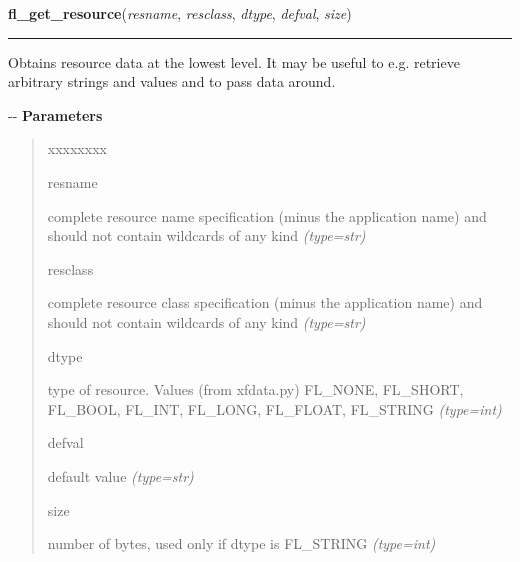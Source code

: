     \label{xformslib:flxbasic:fl_get_resource}

    \vspace{0.5ex}

\hspace{.8\funcindent}\begin{boxedminipage}{\funcwidth}

    \raggedright \textbf{fl\_get\_resource}(\textit{resname}, \textit{resclass}, \textit{dtype}, \textit{defval}, \textit{size})

    \vspace{-1.5ex}

    \rule{\textwidth}{0.5\fboxrule}
\setlength{\parskip}{2ex}

Obtains resource data at the lowest level. It may be useful to e.g.
retrieve arbitrary strings and values and to pass data around.

-{}-
\setlength{\parskip}{1ex}
      \textbf{Parameters}
      \vspace{-1ex}

      \begin{quote}
        \begin{Ventry}{xxxxxxxx}

          \item[resname]


complete resource name specification (minus the application name)
and should not contain wildcards of any kind
            {\it (type=str)}

          \item[resclass]


complete resource class specification (minus the application name)
and should not contain wildcards of any kind
            {\it (type=str)}

          \item[dtype]


type of resource. Values (from xfdata.py) FL\_NONE, FL\_SHORT, FL\_BOOL,
FL\_INT, FL\_LONG, FL\_FLOAT, FL\_STRING
            {\it (type=int)}

          \item[defval]


default value
            {\it (type=str)}

          \item[size]


number of bytes, used only if dtype is FL\_STRING
            {\it (type=int)}


\end{Ventry}
\end{quote}
\end{boxedminipage}

